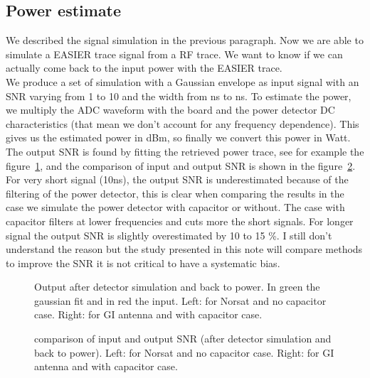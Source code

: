 \subsection{Power estimate}
We described the  signal simulation in the previous  paragraph. Now we
are able to simulate a EASIER trace signal from a RF trace. We want to
know if we  can actually come back to the input  power with the EASIER
trace.\\ We  produce a set of  simulation with a  Gaussian envelope as
input  signal with an  SNR varying  from 1  to 10  and the  width from
\unit[10]{ns} to  \unit[500]{ns}.  To estimate the  power, we multiply
the  ADC   waveform  with  the   board  and  the  power   detector  DC
characteristics  (that  mean  we   don't  account  for  any  frequency
dependence).  This gives us the  estimated power in dBm, so finally we
convert this  power in Watt.  The  output SNR is found  by fitting the
retrieved power trace, see for example the figure~\ref{fig:exfit}, and
the   comparison  of   input  and   output   SNR  is   shown  in   the
figure~\ref{fig:estimate}.  For  very short signal  (10ns), the output
SNR is underestimated because of  the filtering of the power detector,
this is clear  when comparing the results in the  case we simulate the
power  detector with  capacitor or  without. The  case  with capacitor
filters at  lower frequencies  and cuts more  the short  signals.  For
longer signal the output SNR is slightly overestimated by 10 to 15 \%.
I still  don't understand the reason  but the study  presented in this
note will  compare methods to  improve the SNR  it is not  critical to
have a systematic bias.
\begin{figure}[!ht]
  \centering
  \hspace*{-3ex}
  \caption{Output  after detector  simulation  and back  to power.  In
    green the gaussian fit and in  red the input. Left: for Norsat and
    no capacitor case. Right: for GI antenna and with capacitor case.}
  \label{fig:exfit}
\end{figure}
\begin{figure}[!ht]
  \centering
  \hspace*{-3ex}
  \caption{comparison  of   input  and  output   SNR  (after  detector
    simulation and back  to power). Left: for Norsat  and no capacitor
    case. Right: for GI antenna and with capacitor case.}
  \label{fig:estimate}
\end{figure}



